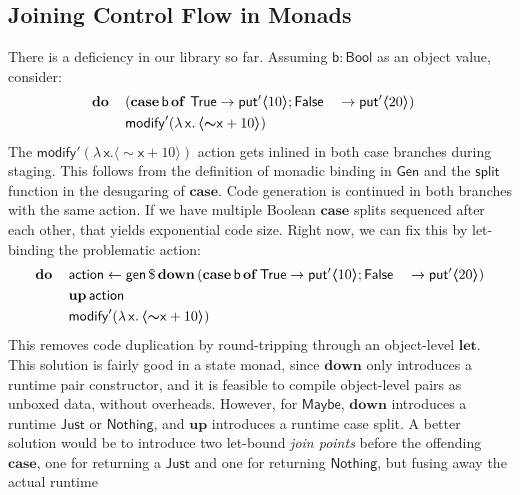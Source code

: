 \documentclass[acmsmall,screen,review,anonymous]{acmart}
\newcommand{\mit}[1]{{\mathsf{#1}}}
\newcommand{\msf}[1]{{\mathsf{#1}}}
\newcommand{\mbf}[1]{{\mathbf{#1}}}
\newcommand{\bs}[1]{\boldsymbol{#1}}
\newcommand{\mdo}{\mbf{do}\,}
\newcommand{\lam}{\lambda\,}
\newcommand{\of}{\mbf{of}\,}
\newcommand{\vb}{\mathsf{b}}
\newcommand{\vx}{\mathsf{x}}
\newcommand{\Bool}{\msf{Bool}}
\newcommand{\fro}{\leftarrow}
\newcommand{\case}{\mbf{case\,}}
\newcommand{\spl}{{\bs{\sim}}}
\newcommand{\ql}{{\bs{\langle}}}
\newcommand{\qr}{{\bs{\rangle}}}
\newcommand{\bind}{\mathbin{>\!\!>\mkern-6.7mu=}}
\newcommand{\True}{\msf{True}}
\newcommand{\False}{\msf{False}}
\newcommand{\Maybe}{\msf{Maybe}}
\newcommand{\Nothing}{\msf{Nothing}}
\newcommand{\Just}{\msf{Just}}
\theoremstyle{remark}
\newcommand{\mup}{\mbf{up}}
\newcommand{\mdown}{\mbf{down}}
\newcommand{\Gen}{\msf{Gen}}
\newcommand{\gen}{\mit{gen}}
\newcommand{\qt}[1]{\ql#1\qr}
\newcommand{\dlr}{\,\$\,}
\newcommand{\modify}{\mit{modify}}
\newcommand{\mput}{\mit{put}}
\begin{document}
\subsection{Joining Control Flow in Monads}\label{sec:joining-control-flow-in-monads}

There is a deficiency in our library so far. Assuming $\vb : \Bool$ as an object value, consider:
\begin{alignat*}{5}
  & \hspace{-1em}\mdo && (\case \vb\,\of\,\True\to \mput' \qt{10}; \False &&\to \mput' \qt{20})\\
  & \hspace{-1em}     && \mathrlap{\modify' (\lam \vx.\,\qt{\spl \vx + 10})}
\end{alignat*}
The $\modify' (\lam \vx. \qt{\spl \vx + 10})$ action gets inlined in both case
branches during staging. This follows from the definition of monadic binding in
$\Gen$ and the $\mit{split}$ function in the desugaring of $\mbf{case}$. Code
generation is continued in both branches with the same action. If we have
multiple Boolean $\mbf{case}$ splits sequenced after each other, that yields
exponential code size. Right now, we can fix this by let-binding the problematic
action:
\begin{alignat*}{5}
  & \mdo && \msf{action} \fro \gen \dlr \mdown\,(\case \vb\,\of \True \to \mput' \qt{10};\False &&\to \mput' \qt{20}) \\
  &      && \mup\,\msf{action}\\
  &      && \mathrlap{\modify' (\lam \vx.\,\qt{\spl \vx + 10})}
\end{alignat*}
This removes code duplication by round-tripping through an object-level
$\mbf{let}$. This solution is fairly good in a state monad, since $\mdown$ only
introduces a runtime pair constructor, and it is feasible to compile
object-level pairs as unboxed data, without overheads. However, for $\Maybe$,
$\mdown$ introduces a runtime $\Just$ or $\Nothing$, and $\mup$ introduces a
runtime case split. A better solution would be to introduce two let-bound
\emph{join points} before the offending $\mbf{case}$, one for returning a
$\Just$ and one for returning $\Nothing$, but fusing away the actual runtime
\end{document}
